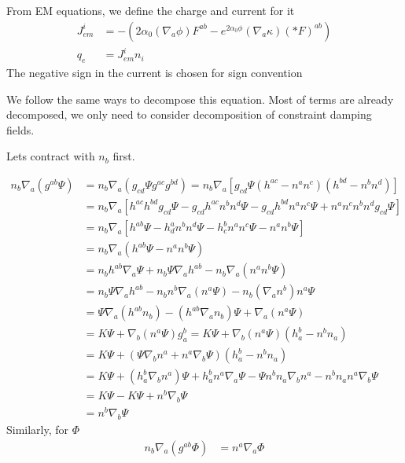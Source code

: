 \documentclass[prd]{revtex4}
\begin{document}
From EM equations, we define the charge and current for it
\begin{align}
J_{em}^i &= - ( 2 \alpha_0 (\nabla_a \phi) F^{ab}  - e^{2 \alpha_0 \phi} (\nabla_a \kappa) (\ast F)^{ab} ) \nonumber \\
q_e &= J_{em}^i n_i \nonumber 
\end{align}
The negative sign in the current is chosen for sign convention

We follow the same ways to decompose this equation. Most of terms are already decomposed, we only need to consider decomposition of constraint damping fields.

Let\textsc{}s contract with $n_b$ first.

\begin{align}
n_b \nabla_a (g^{ab} \Psi) &= n_b \nabla_a (g_{cd} \Psi g^{ac} g^{bd}) = n_b \nabla_a [g_{cd} \Psi (h^{ac} - n^a n^c)(h^{bd}-n^b n^d)] \nonumber \\
					&=n_b \nabla_a [ h^{ac} h^{bd} g_{cd} \Psi - g_{cd} h^{ac} n^b n^d \Psi - g_{cd} h^{bd} n^a n^c \Psi + n^a n^c n^b n^d g_{cd} \Psi ] \nonumber \\
					&=n_b \nabla_a [ h^{ab} \Psi - h_{d}^a n^b n^d \Psi - h_{c}^b n^a n^c \Psi - n^a n^b \Psi ] \nonumber \\
					&=n_b \nabla_a ( h^{ab} \Psi - n^a n^b \Psi ) \nonumber \\
					&=n_b h^{ab} \nabla_a \Psi + n_b \Psi \nabla_a h^{ab} - n_b \nabla_a (n^a n^b \Psi) \nonumber \\
					&=n_b \Psi \nabla_a h^{ab} - n_b n^b \nabla_a (n^a \Psi) - n_b (\nabla_a n^b) n^a \Psi \nonumber \\
					&=\Psi \nabla_a (h^{ab} n_b) - (h^{ab} \nabla_a n_b) \Psi + \nabla_a (n^a \Psi) \nonumber \\
					&= K \Psi + \nabla_b (n^a \Psi) g_a^b = K \Psi + \nabla_b (n^a \Psi) (h_a^b - n^b n_a) \nonumber \\
					&= K \Psi + (\Psi \nabla_b n^a + n^a \nabla_b \Psi)(h_a^b -n^b n_a) \nonumber \\
					&= K\Psi + (h_a^b \nabla_b n^a)\Psi + h_a^b n^a \nabla_a \Psi - \Psi n^b n_a \nabla_b n^a - n^b n_a n^a \nabla_b \Psi \nonumber \\
					&= K\Psi - K\Psi + n^b \nabla_b \Psi \nonumber \\
					&= n^b \nabla_b \Psi
\end{align}
Similarly, for $\Phi$
\begin{align}
n_b \nabla_a (g^{ab} \Phi) & = n^a \nabla_a \Phi
\end{align}
\end{document}
